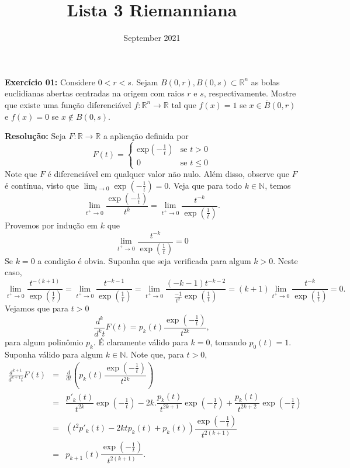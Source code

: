 \documentclass[twoside,openright,titlepage,numbers=noenddot,headinclude,  lineheaders footinclude=true,cleardoublepage=empty,BCOR=5mm,paper=a4,fontsize=12pt ]{scrbook}
\title{Lista 3 Riemanniana}
\author{}
\date{September 2021}
\begin{document}
\maketitle


\textbf{Exercício 01:} 
Considere $0 < r < s$. 
Sejam $B(0,r), B(0,s)\subset \mathbb{R}^n$ as bolas euclidianas abertas centradas na origem com raios $r$ e $s$, respectivamente. 
Mostre que existe uma função diferenciável $f : \mathbb{R}^n \rightarrow \mathbb{R}$ tal que $f(x) = 1$ se $x \in \overline{B}(0,r)$ e $ f(x) = 0 $ se $ x \notin B(0,s)$.
\vspace{0.5cm}

\textbf{Resolução:} 
Seja $F: \mathbb{R} \rightarrow \mathbb{R} $ a aplicação definida por
\[
    F(t) = \begin{cases}
                \text{exp}{\left(-\frac{1}{t}\right)} & \text{se } t > 0 \\
                0  & \text{se } t \leq 0
            \end{cases}
\]
Note que $ F $ é diferenciável em qualquer valor não nulo. 
Além disso, observe que $F$ é contínua, visto que $\lim _{t \to 0} \exp{\left(-\frac{1}{t}\right)} = 0$. 
Veja que para todo $k \in \mathbb{N}$, temos
\[
    \lim _{t^+ \to 0}\dfrac{\exp\left( -\frac{1}{t}\right)}{t^k} = \lim_{t^+ \to 0} \dfrac{t^{-k}}{\exp\left( \frac{1}{t}\right)}.
\]
Provemos por indução em $k$ que
\begin{equation}\label{equation:eq1}
    \lim _{t^+ \to 0}\dfrac{t^{-k}}{\exp\left( \frac{1}{t}\right)} = 0
\end{equation}
Se $k=0$ a condição é obvia. 
Suponha que seja verificada para algum $k >0$. Neste caso,
\[
    \lim _{t^+ \to 0} \dfrac{t^{- (k+1)}}{\exp\left( \frac{1}{t}\right)} 
    = \lim_{t^+ \to 0}   \dfrac{t^{- k - 1 }}{\exp\left( \frac{1}{t}\right)} 
    = \lim _{t^+ \to 0}  \dfrac{(-k-1)t^{- k - 2 }}{\frac{-1}{t^2}\exp\left( \frac{1}{t}\right)}
    =(k+1)\lim _{t^+ \to 0} \dfrac{t^{- k }}{\exp\left( \frac{1}{t}\right)}
    =0.
\]
Vejamos que para $t > 0 $
\[
    \frac{d^k}{d^k t} F(t) 
    = p_k (t) \dfrac{\exp\left(  -\frac{1}{t} \right)}{t^{2k}},  
\]
para algum polinômio $p_k$. 
É claramente válido para $ k = 0 $, tomando $p_0(t) = 1$. Suponha válido para algum $ k \in \mathbb{N}$. 
Note que, para $t>0$,
\[
    \begin{array}{rcl}
        \frac{d^{k+1}}{d^{k+1} t} F (t) &=& \frac{d}{d t} \left(p_k (t) \dfrac{\exp\left(  -\frac{1}{t} \right)}{t^{2k}}  \right) \\
        &=& \dfrac{p'_k (t)}{t^{2k}} \exp\left(  -\frac{1}{t} \right)  - 2k.\dfrac{p _ k(t)}{ t^{2k + 1} }\exp\left(  -\frac{1}{t} \right)  + \dfrac{p _ k(t)}{ t^{2k + 2} }\exp\left(  -\frac{1}{t} \right) \\
        &=& (t^2 p'_ k (t) - 2kt p _k(t) + p_k (t)) \dfrac{\exp\left(  -\frac{1}{t} \right)}{t^{2(k+1)}}\\
        &=& p _{k+1} (t) \dfrac{\exp\left(  -\frac{1}{t} \right)}{t^{2(k+1)}}.
    \end{array}
\]
\end{document}

